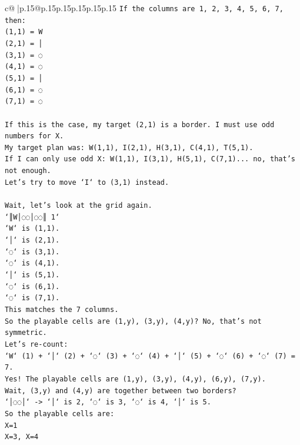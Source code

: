 \documentclass{article}
\begin{document}
{\begin{supertabular}{c@{$\;$}|p{.15\linewidth}@{}p{.15\linewidth}p{.15\linewidth}p{.15\linewidth}p{.15\linewidth}p{.15\linewidth}}
{{{\texttt{If the columns are 1, 2, 3, 4, 5, 6, 7, then:} \\
\texttt{(1,1) = W} \\
\texttt{(2,1) = │} \\
\texttt{(3,1) = ◌} \\
\texttt{(4,1) = ◌} \\
\texttt{(5,1) = │} \\
\texttt{(6,1) = ◌} \\
\texttt{(7,1) = ◌} \\
\\ 
\texttt{If this is the case, my target (2,1) is a border. I must use odd numbers for X.} \\
\texttt{My target plan was: W(1,1), I(2,1), H(3,1), C(4,1), T(5,1).} \\
\texttt{If I can only use odd X: W(1,1), I(3,1), H(5,1), C(7,1)... no, that's not enough.} \\
\texttt{Let's try to move `I` to (3,1) instead.} \\
\\ 
\texttt{Wait, let's look at the grid again.} \\
\texttt{`║W│◌◌│◌◌║ 1`} \\
\texttt{`W` is (1,1).} \\
\texttt{`│` is (2,1).} \\
\texttt{`◌` is (3,1).} \\
\texttt{`◌` is (4,1).} \\
\texttt{`│` is (5,1).} \\
\texttt{`◌` is (6,1).} \\
\texttt{`◌` is (7,1).} \\
\texttt{This matches the 7 columns.} \\
\texttt{So the playable cells are (1,y), (3,y), (4,y)? No, that's not symmetric.} \\
\texttt{Let's re{-}count:} \\
\texttt{`W` (1) + `│` (2) + `◌` (3) + `◌` (4) + `│` (5) + `◌` (6) + `◌` (7) = 7.} \\
\texttt{Yes! The playable cells are (1,y), (3,y), (4,y), (6,y), (7,y).} \\
\texttt{Wait, (3,y) and (4,y) are together between two borders?} \\
\texttt{`│◌◌│` {-}> `│` is 2, `◌` is 3, `◌` is 4, `│` is 5.} \\
\texttt{So the playable cells are:} \\
\texttt{X=1} \\
\texttt{X=3, X=4} \\
}}}
\end{supertabular}}
\end{document}
